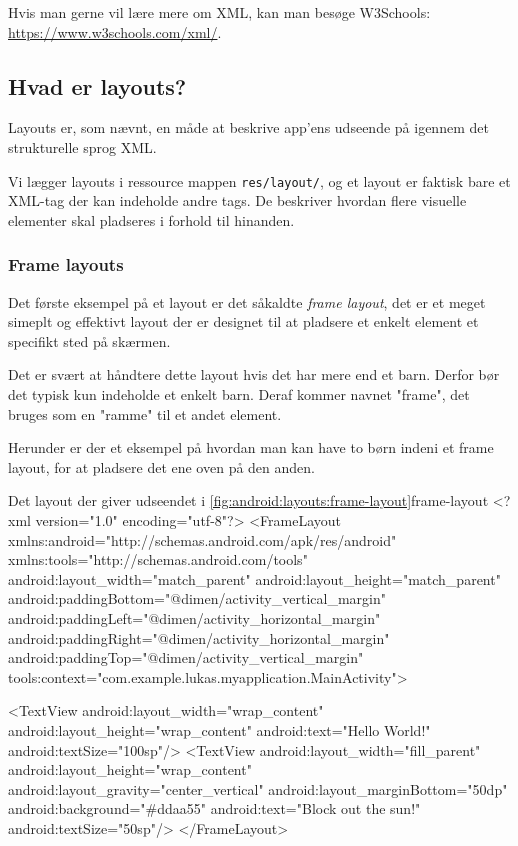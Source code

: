 Hvis man gerne vil lære mere om XML, kan man besøge W3Schools: \url{https://www.w3schools.com/xml/}.


\subsection{Hvad er layouts?}
Layouts er, som nævnt, en måde at beskrive app'ens udseende på igennem det strukturelle sprog XML.

Vi lægger layouts i ressource mappen \texttt{res/layout/}, og et layout er faktisk bare et XML-tag der kan indeholde andre tags. De beskriver hvordan flere visuelle elementer skal pladseres i forhold til hinanden.

\subsubsection{Frame layouts}

Det første eksempel på et layout er det såkaldte \textit{frame layout}, det er et meget simeplt og effektivt layout der er designet til at pladsere et enkelt element et specifikt sted på skærmen.

Det er svært at håndtere dette layout hvis det har mere end et barn. Derfor bør det typisk kun indeholde et enkelt barn. Deraf kommer navnet "frame", det bruges som en "ramme" til et andet element.

Herunder er der et eksempel på hvordan man kan have to børn indeni et frame layout, for at pladsere det ene oven på den anden.

\begin{figure}[H]
	\begin{center}
		\label{fig:android:layouts:frame-layout}
	\end{center}
\end{figure}

\begin{XmlCode}{Det layout der giver udseendet i \autoref{fig:android:layouts:frame-layout}}{frame-layout}
	<?xml version="1.0" encoding="utf-8"?>
	<FrameLayout xmlns:android="http://schemas.android.com/apk/res/android"
		xmlns:tools="http://schemas.android.com/tools"
		android:layout_width="match_parent"
		android:layout_height="match_parent"
		android:paddingBottom="@dimen/activity_vertical_margin"
		android:paddingLeft="@dimen/activity_horizontal_margin"
		android:paddingRight="@dimen/activity_horizontal_margin"
		android:paddingTop="@dimen/activity_vertical_margin"
		tools:context="com.example.lukas.myapplication.MainActivity">
	
		<TextView
			android:layout_width="wrap_content"
			android:layout_height="wrap_content"
			android:text="Hello World!"
			android:textSize="100sp"/>
		<TextView
			android:layout_width="fill_parent"
			android:layout_height="wrap_content"
			android:layout_gravity="center_vertical"
			android:layout_marginBottom="50dp"
			android:background="#ddaa55"
			android:text="Block out the sun!"
			android:textSize="50sp"/>
	</FrameLayout>
\end{XmlCode}

